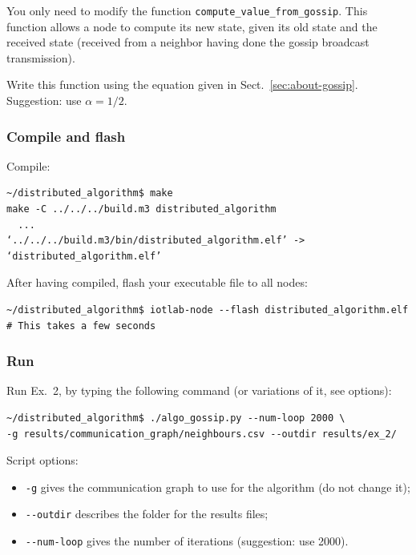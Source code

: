 \documentclass[oneside]{article}
\begin{document}
You only need to modify the function \verb=compute_value_from_gossip=.
This function allows a node to compute its new state, 
given its old state and the received state
(received from a neighbor having done the gossip broadcast transmission).

Write this function using the equation given in Sect.~\ref{sec:about-gossip}.
Suggestion: use $\alpha = 1/2$.

\subsubsection{Compile and flash}

Compile:
    \begin{verbatim}~/distributed_algorithm$ make
make -C ../../../build.m3 distributed_algorithm
  ...
‘../../../build.m3/bin/distributed_algorithm.elf’ -> ‘distributed_algorithm.elf’
\end{verbatim}

After having compiled, flash your executable file to all nodes:
    \begin{verbatim}~/distributed_algorithm$ iotlab-node --flash distributed_algorithm.elf
# This takes a few seconds
\end{verbatim}

\subsubsection{Run} %
Run Ex.~2, by typing the following command (or variations of it, see options):


\begin{verbatim}
~/distributed_algorithm$ ./algo_gossip.py --num-loop 2000 \
-g results/communication_graph/neighbours.csv --outdir results/ex_2/
\end{verbatim}



Script options:
\begin{itemize}
	\item \verb=-g= gives the communication graph to use for the algorithm (do not change it);
	\item \verb=--outdir= describes the folder for the results files;
    \item \verb=--num-loop=  gives the number of iterations (suggestion: use 2000).
\end{itemize}
\end{document}
